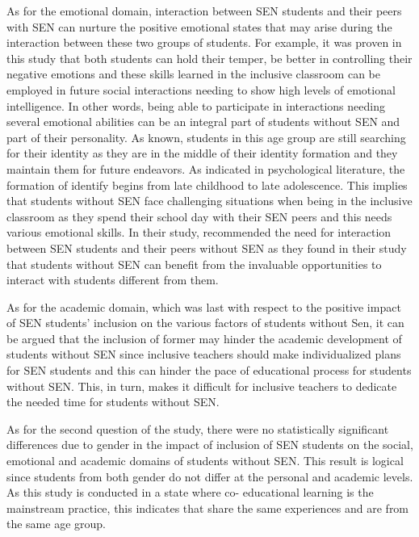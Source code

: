 \documentclass[10pt]{NSP1}
\begin{document}
As for the emotional domain, interaction between SEN students and their peers with SEN can nurture the positive emotional states that may arise during the interaction between these two groups of students. For example, it was proven in this study that both students can hold their temper, be better in controlling their negative emotions and these skills learned in the inclusive classroom can be employed in future social interactions needing to show high levels of emotional intelligence. In other words, being able to participate in interactions needing several emotional abilities can be an integral part of students without SEN and part of their personality. As known, students in this age group are still searching for their identity as they are in the middle of their identity formation and they maintain them for future endeavors. As indicated in psychological literature, the formation of identify begins from late childhood to late adolescence. This implies that students without SEN face challenging situations when being in the inclusive classroom as they spend their school day with their SEN peers and this needs various emotional skills. In their study, \cite{12} recommended the need for interaction between SEN students and their peers without SEN as they found in their study that students without SEN can benefit from the invaluable opportunities to interact with students different from them.

As for the academic domain, which was last with respect to the positive impact of SEN students' inclusion on the various factors of students without Sen, it can be argued that the inclusion of former may hinder the academic development of students without SEN since inclusive teachers should make individualized plans for SEN students and this can hinder the pace of educational process for students without SEN. This, in turn, makes it difficult for inclusive teachers to dedicate the needed time for students without SEN.

As for the second question of the study, there were no statistically significant differences due to gender in the impact of inclusion of SEN students on the social, emotional and academic domains of students without SEN. This result is logical since students from both gender do not differ at the personal and academic levels. As this study is conducted in a state where co- educational learning is the mainstream practice, this indicates that share the same experiences and are from the same age group.

\par\medskip{}\smallskip
\end{document}
